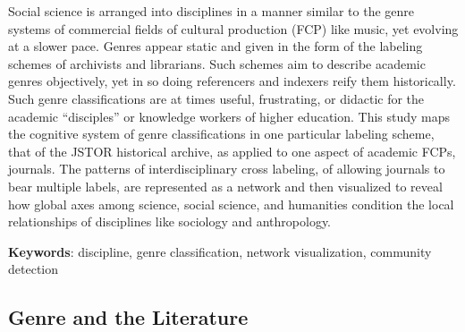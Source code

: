 \documentclass[]{book}
\theoremstyle{definition}
\theoremstyle{definition}
\theoremstyle{definition}
\theoremstyle{remark}
\begin{document}
Social science is arranged into disciplines in a manner
similar to the genre systems of commercial fields of cultural production
(FCP) like music, yet evolving at a slower pace. Genres appear static
and given in the form of the labeling schemes of archivists and
librarians. Such schemes aim to describe academic genres objectively,
yet in so doing referencers and indexers reify them historically. Such
genre classifications are at times useful, frustrating, or didactic for
the academic ``disciples'' or knowledge workers of higher education.
This study maps the cognitive system of genre classifications in one
particular labeling scheme, that of the JSTOR historical archive, as
applied to one aspect of academic FCPs, journals. The patterns of
interdisciplinary cross labeling, of allowing journals to bear multiple
labels, are represented as a network and then visualized to reveal how
global axes among science, social science, and humanities condition the
local relationships of disciplines like sociology and anthropology.




\textbf{Keywords}: discipline, genre classification, network visualization,
community detection

\hypertarget{genre-and-the-literature}{%
\subsection{Genre and the Literature}\label{genre-and-the-literature}}
\end{document}
